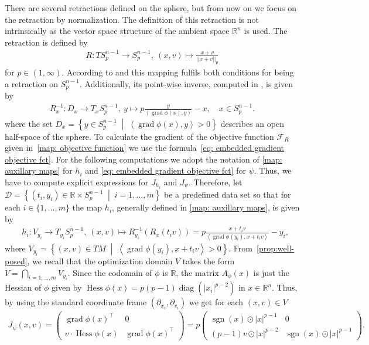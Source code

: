 \documentclass[11pt,a4paper]{article}
\theoremstyle{plain}
\theoremstyle{definition}
\newcommand{\RR}{\mathbb{R}}
\newcommand{\set}[2]{\left\{#1 \;\middle|\; #2\right\}}		%
\DeclareMathOperator{\grad}{grad}
\DeclareMathOperator{\Hess}{Hess}
\DeclareMathOperator{\sgn}{sgn}
\DeclareMathOperator{\diag}{diag}
\begin{document}
%
There are several retractions defined on the sphere, but from now on we focus on the retraction by normalization. 
The definition of this retraction is not intrinsically as the vector space structure of the ambient space $\RR^n$ is used. 
The retraction is defined  by
\begin{align}
	\label{map: retr by normalization}
	R\colon TS_p^{n - 1}\to S_p^{n-1},\ (x, v)\mapsto \frac{x + v}{||x + v||_p} 
\end{align}
for $p\in(1, \infty)$.
According to \cite[Prop.~3]{sato2023} and \cite[Prop.~3.2, p.~8]{absil2012} this mapping fulfils both conditions for being a retraction on $S_p^{n-1}$.
Additionally, its point-wise inverse, computed in \cite[Prop.~4]{sato2023}, is given by
\begin{align*}
	R^{-1}_x\colon D_x\to T_xS_p^{n - 1},\
	y\mapsto p\frac{y}{\left<\grad\phi(x), y\right>} - x,
	\quad 
	x\in S_p^{n-1}.
\end{align*}
where the set $D_x = \set{y\in S_p^{n - 1}}{\left<\grad\phi(x), y\right> > 0}$ describes an open half-space of the sphere. To calculate the gradient of the objective function $\mathcal{F}_R$ given in~\eqref{map: objective function} we use the formula~\eqref{eq: embedded gradient objective fct}. For the following computations we adopt the notation of \eqref{map: auxillary maps} for $h_i$ and \eqref{eq: embedded gradient objective fct} for $\psi$. Thus, we have to compute explicit expressions for $J_{h_i}$ and $J_{\psi}$. Therefore, let $\mathcal{D} = \set{(t_i, y_i)\in \RR\times S_p^{n-1}}{i = 1, \ldots, m}$ be a predefined data set so that for each $i\in\{1, \ldots, m\}$ the map $h_i$, generally defined in \eqref{map: auxillary maps}, is given by
\begin{align*}
	&h_i\colon V_{y_i}\to T_{y_i}S_p^{n-1},\ 
	(x, v)\mapsto R_{y_i}^{-1}(R_x(t_iv))
	= p\frac{x + t_iv}{\left<\grad\phi(y_i), x + t_iv\right>} - y_i,
\end{align*}
where $V_{y_i} = \set{(x, v)\in TM}{\left<\grad\phi(y_i), x + t_iv\right> > 0}$. From~\cref{prop:well-posed}, we recall that the optimization domain $V$ takes the form $V = \bigcap_{i= 1, \ldots, m} V_{y_i}$.
Since the codomain of $\phi$ is $\RR$, the matrix $A_{\phi}(x)$ is just the Hessian of $\phi$ given by $\Hess\phi(x) = p(p-1) \diag(|x_i|^{p-2})$ in $x\in\RR^n$. Thus, by using the standard coordinate frame $(\partial_{x_i}, \partial_{v_i})$ we get for each $(x, v)\in V$
\begin{align*}
	J_{\psi}(x, v)
	= \begin{pmatrix}
		\grad\phi(x)^{\top} & 0 \\
		v\cdot \Hess\phi(x) & \grad\phi(x)^{\top}
	\end{pmatrix}
	= p \begin{pmatrix}
		\sgn(x)\odot |x|^{p-1} & 0 \\
		(p-1) v\odot |x|^{p-2} & \sgn(x)\odot |x|^{p-1}
	\end{pmatrix}.
\end{align*}
\end{document}
